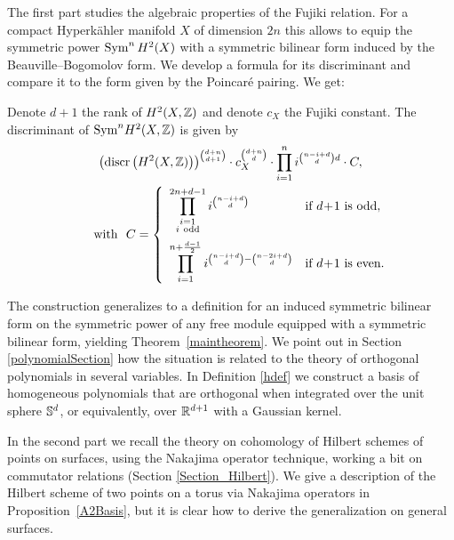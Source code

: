 The first part \cite{Kapfer} studies the algebraic properties of the Fujiki relation. For a compact Hyperk\"ahler manifold $X$ of dimension $2n$ this allows to equip the symmetric power $\Sym^nH^2(X)$ with a symmetric bilinear form induced by the Beauville--Bogomolov form. We develop a formula for its discriminant and compare it to the form given by the Poincar\'e pairing.
We get:
\begin{theorem}
Denote $d+1$ the rank of $H^2(X,\Z)$ and denote $c_X$ the Fujiki constant.
The discriminant of $\Sym^n\!H^2(X,\Z)$ is given by
\begin{gather*}
\left(\discr \left(H^2(X,\Z)\right)\right)^{\binom{d+n}{d+1}}\cdot c_X^{\binom{d+n}{d}} \cdot \prod_{i=1}^n i^{\binom{n-i+d}{d}d} 
\cdot C, \\
\qquad \text{with } \ 
C=
\left\{
 \begin{array}{*2{l}p{5cm}}
 \displaystyle\prod_{\substack{i=1 \\ i\ \text{odd}\\\ }}^{2n+d-1}i^{\binom{n-i+d}{d}} &\text{if }d\!+\! 1\text{ is odd}, \\
 \displaystyle\prod_{i=1}^{n+\frac{d-1}{2}} i^{\binom{n-i+d}{d} - \binom{n-2i+d}{d}} &\text{if }d\! +\! 1\text{ is even}.
\end{array}
\right.
\end{gather*}
\end{theorem}
The construction generalizes to a definition for an induced symmetric bilinear form on the symmetric power of any free module equipped with a symmetric bilinear form, yielding Theorem~\ref{maintheorem}. We point out in Section \ref{polynomialSection} how the situation is related to the theory of orthogonal polynomials in several variables.
In Definition \ref{hdef} we construct a basis of homogeneous polynomials that are orthogonal when integrated over the unit sphere $\S^d$, or equivalently, over $\R^{d+1}$ with a Gaussian kernel.

In the second part we recall the theory on cohomology of Hilbert schemes of points on surfaces, using the Nakajima operator technique, working a bit on commutator relations (Section \ref{Section_Hilbert}).
We give a description of the Hilbert scheme of two points on a torus via Nakajima operators in Proposition~\ref{A2Basis}, but it is clear how to derive the generalization on general surfaces.

